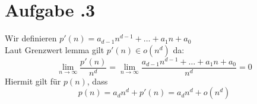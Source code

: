 	\section*{Aufgabe \bn.3}
	Wir definieren $p'(n)=a _{ d-1 } n^{ d-1 } + \dots + a_1n+a_0 $ \\
	Laut Grenzwert lemma gilt $ p'(n)\in o(n^d) $ da:
	\[
		\lim _{ n \rightarrow \infty } \frac{ p'(n) }{ n^d } =
		\lim _{ n \rightarrow \infty } \frac{ a _{ d-1 } n^{ d-1 } + \dots + a_1n+a_0 }{ n^d } = 0
	\]
	Hiermit gilt für $ p(n) $, dass
	\[p(n)=a_dn^d + p'(n) = a_dn^d + o(n^d)\]